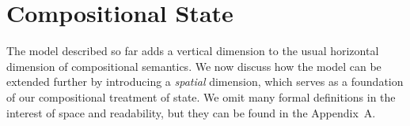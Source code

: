 \documentclass[acmsmall,screen,review,nonacm]{acmart}
\newcommand{\kw}[1]{\ensuremath{ \mathsf{#1} }}
\newcommand{\que}{\circ}
\newcommand{\ans}{\bullet}
\begin{document}
%
%
%
%
%


\section{Compositional State} \label{sec:scomp} %


The model described so far adds a vertical dimension
to the usual horizontal dimension of compositional semantics.
We now discuss how the model can be extended further
by introducing a \emph{spatial} dimension,
which serves as a foundation of our compositional treatment of state.
We omit many formal definitions
in the interest of space and readability,
but they can be found in the Appendix~A.
\end{document}
